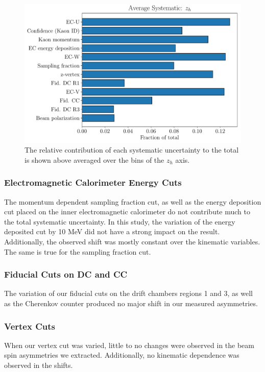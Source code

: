 \begin{figure}
	\centering
	\includegraphics[width=16cm]{image/plots/kaon-bsa/bar-systematics-z.pdf}
	\caption{The relative contribution of each systematic uncertainty to the total is shown above averaged over the bins of the $z_h$ axis.}
\end{figure}

\subsubsection*{Electromagnetic Calorimeter Energy Cuts}
The momentum dependent sampling fraction cut, as well as the energy deposition cut placed on the inner electromagnetic calorimeter do not contribute much to the total systematic uncertainty.  In this study, the variation of the energy deposited cut by 10 MeV did not have a strong impact on the result.  Additionally, the observed shift was mostly constant over the kinematic variables.  The same is true for the sampling fraction cut.

\subsubsection*{Fiducial Cuts on DC and CC}
The variation of our fiducial cuts on the drift chambers regions 1 and 3, as well as the Cherenkov counter produced no major shift in our measured asymmetries.  

\subsubsection*{Vertex Cuts}
When our vertex cut was varied, little to no changes were observed in the beam spin asymmetries we extracted.  Additionally, no kinematic dependence was observed in the shifts.

